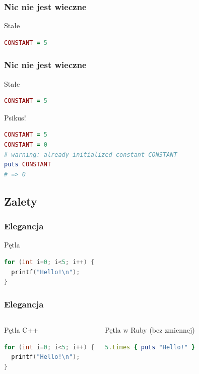 
\begin{frame}[fragile]
\frametitle{Nic nie jest wieczne}
\begin{block}{Stałe}
\begin{lstlisting}[language=Ruby]
CONSTANT = 5
\end{lstlisting}
\end{block}
\end{frame}

\begin{frame}[fragile]
\frametitle{Nic nie jest wieczne}
\begin{block}{Stałe}
\begin{lstlisting}[language=Ruby]
CONSTANT = 5
\end{lstlisting}
\end{block}
\begin{block}{Psikus!}
\begin{lstlisting}[language=Ruby]
CONSTANT = 5
CONSTANT = 0
# warning: already initialized constant CONSTANT
puts CONSTANT
# => 0
\end{lstlisting}
\end{block}
\end{frame}


\subsection{Zalety}


\begin{frame}[fragile]
\frametitle{Elegancja}
\begin{block}{Pętla}
\begin{lstlisting}[language=C++]
for (int i=0; i<5; i++) {
  printf("Hello!\n");
}
\end{lstlisting}
\end{block}
\end{frame}


\begin{frame}[fragile]
\frametitle{Elegancja}
\begin{columns}
 \column{5cm}
    \begin{block}{Pętla C++}
\begin{lstlisting}[language=C++]
for (int i=0; i<5; i++) {
  printf("Hello!\n");
}
\end{lstlisting}
    \end{block}
 \column{5cm}
    \begin{block}{Pętla w Ruby (bez zmiennej)}
\begin{lstlisting}[language=Ruby]
5.times { puts "Hello!" }
\end{lstlisting}
    \end{block}
\end{columns}
\end{frame}

